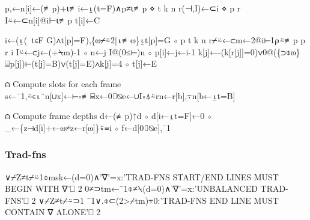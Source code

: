 \documentclass{article}%
\begin{document}
\nwenddocs{}\endmoddef\nwstartdeflinemarkup{}\nwenddeflinemarkup
p,←n[i]←(≢p)+⍳≢i←⍸(t=F)∧p≠⍳≢p ⋄ t k n r(⊣,I)←⊂i ⋄ p r I⍨←⊂n[i]@i⊢⍳≢p
t[i]←C
\nwendcode{}\nwdocspar

\nwenddocs{}\endmoddef\nwstartdeflinemarkup{}\nwenddeflinemarkup
i←(⍸(~t∊F G)∧t[p]=F),\{⍵⌿⍨2|⍳≢⍵\}⍸t[p]=G ⋄ p t k n r⌿⍨←⊂m←2@i⊢1⍴⍨≢p
p r i I⍨←⊂j←(+⍀m)-1 ⋄ n←j I@(0≤⊢)n ⋄ p[i]←j←i-1
k[j]←-(k[r[j]]=0)∨0@(\{⊃⌽⍵\}⌸p[j])⊢(t[j]=B)∨(t[j]=E)∧k[j]=4 ⋄ t[j]←E
\nwendcode{}\nwdocspar

\nwenddocs{}\endmoddef\nwstartdeflinemarkup{}\nwenddeflinemarkup
⍝ Compute slots for each frame
s←¯1,⍨∊⍳¨n[∪x]←⊢∘≢⌸x←0⌷⍉e←∪I∘⍋⍨rn←r[b],⍪n[b←⍸t=B]

⍝ Compute frame depths
d←(≢p)↑d ⋄ d[i←⍸t=F]←0 ⋄ _←\{z⊣d[i]+←⍵≠z←r[⍵]\}⍣≡i ⋄ f←d[0⌷⍉e],¯1
\nwendcode{}\nwdocspar

\subsubsection{Trad-fns}

\nwenddocs{}\endmoddef\nwstartdeflinemarkup{}\nwenddeflinemarkup
∨⌿Z≠t⌿⍨1⌽msk←(d=0)∧'∇'=x:'TRAD-FNS START/END LINES MUST BEGIN WITH ∇'⎕ 2
0≠⊃tm←¯1⌽≠⍀(d=0)∧'∇'=x:'UNBALANCED TRAD-FNS'⎕ 2
∨⌿Z≠t⌿⍨⊃1 ¯1∨.⌽⊂(2>⌿tm)⍪0:'TRAD-FNS END LINE MUST CONTAIN ∇ ALONE'⎕ 2
\nwendcode{}\nwdocspar
\end{document}
